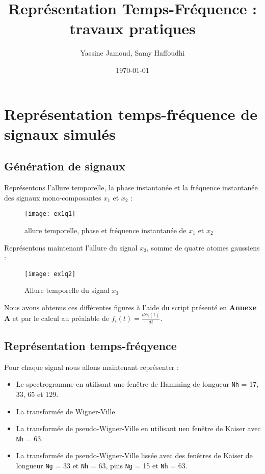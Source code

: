 \documentclass[12pt,a4paper,titlepage]{article}
\title{Représentation  Temps-Fréquence : travaux pratiques}
\author{Yassine Jamoud, Samy Haffoudhi}
\date{\today}
\begin{document}
\maketitle

\setcounter{section}{1}

\section{Représentation temps-fréquence de signaux simulés}

\subsection{Génération de signaux}

Représentons l'allure temporelle, la phase instantanée et la fréquence instantanée des signaux
mono-composantes $x_1$ et $x_2$ :

\begin{figure}[H]
    \caption{allure temporelle, phase et fréquence instantanée de $x_1$ et $x_2$}
    \texttt{[image: ex1q1]}
    \centering
\end{figure}

Représentons maintenant l'allure du signal $x_3$, somme de quatre atomes gaussiens :

\begin{figure}[H]
    \caption{Allure temporelle du signal $x_3$}
    \texttt{[image: ex1q2]}
    \centering
\end{figure}

Nous avons obtenus ces différentes figures à l'aide du script présenté en \textbf{Annexe A} et par le calcul
au préalable de $f_i(t) = \frac{d\phi_i(t)}{dt}$.

\subsection{Représentation temps-fréqyence}

Pour chaque signal nous allons maintenant représenter :

\begin{itemize}
    \item{Le spectrogramme en utilisant une fenêtre de Hamming de longueur \texttt{Nh} = 17, 33, 65
        et 129.}
    \item{La transformée de Wigner-Ville}
    \item{La transformée de pseudo-Wigner-Ville en utilisant uen fenêtre de Kaiser avec \texttt{Nh}
        = 63.}
    \item{La transformée de pseudo-Wigner-Ville lissée avec des fenêtres de Kaiser de longueur
        \texttt{Ng} = 33 et \texttt{Nh} = 63, puis \texttt{Ng} = 15 et \texttt{Nh} = 63.}
\end{itemize}
\end{document}
